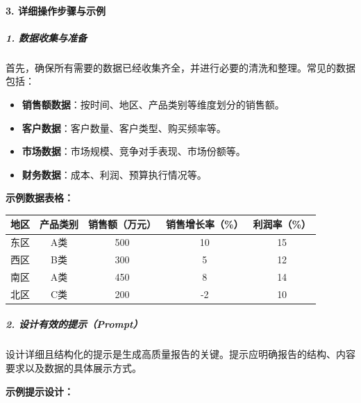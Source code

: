 \paragraph{3. 详细操作步骤与示例}

\subparagraph{1. 数据收集与准备}

首先，确保所有需要的数据已经收集齐全，并进行必要的清洗和整理。常见的数据包括：

\begin{itemize}
    \item \textbf{销售额数据}：按时间、地区、产品类别等维度划分的销售额。
    \item \textbf{客户数据}：客户数量、客户类型、购买频率等。
    \item \textbf{市场数据}：市场规模、竞争对手表现、市场份额等。
    \item \textbf{财务数据}：成本、利润、预算执行情况等。
\end{itemize}

\textbf{示例数据表格：}

\begin{center}
\begin{tabular}{|c|c|c|c|c|}
\hline
地区 & 产品类别 & 销售额（万元） & 销售增长率（\%） & 利润率（\%）  \\
\hline
东区 & A类 & 500 & 10 & 15  \\
西区 & B类 & 300 & 5 & 12  \\
南区 & A类 & 450 & 8 & 14 \\ 
北区 & C类 & 200 & -2 & 10  \\
\hline
\end{tabular}
\end{center}

\subparagraph{2. 设计有效的提示（Prompt）}

设计详细且结构化的提示是生成高质量报告的关键。提示应明确报告的结构、内容要求以及数据的具体展示方式。

\textbf{示例提示设计：}


